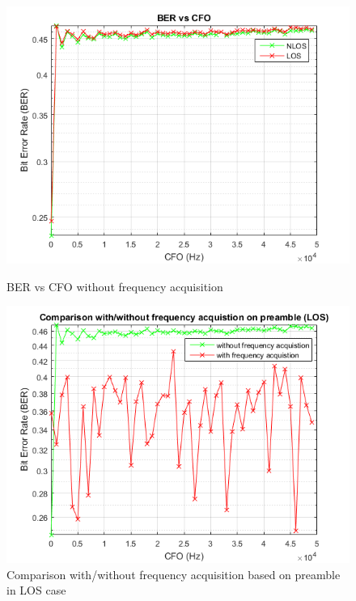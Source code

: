 \documentclass[a4paper]{article}
\begin{document}
	\vspace*{+5mm}
    	\begin{figure}[h]
		\begin{minipage}[t]{0.5\linewidth}
			\centering
			\includegraphics[scale=0.5]{figures/BERvsCFO.png}
			\centering
			\caption{BER vs CFO without frequency acquisition}
            \label{fig:BERvsCFO}
		\end{minipage}
		\begin{minipage}[t]{0.5\linewidth}
			\centering
			\includegraphics[scale=0.5]{figures/CompFA.png}
			\centering
			\caption{Comparison with/without frequency acquisition based on preamble in LOS case}
            \label{fig:CompFA}
		\end{minipage}
	\end{figure}
    
\end{document}
